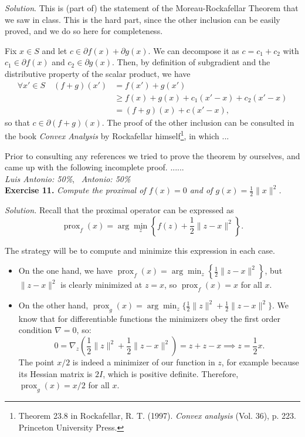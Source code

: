 \documentclass[12pt]{article}
\begin{document}
\emph{Solution}. This is (part of) the statement of the Moreau-Rockafellar Theorem that we saw in class. This is the hard part, since the other inclusion can be easily proved, and we do so here for completeness.\newpage

Fix $x\in S$ and let $c\in \partial f(x) + \partial g(x)$. We can decompose it as $c=c_1+c_2$ with $c_1\in\partial f(x)$ and $c_2\in \partial g(x)$. Then, by definition of subgradient and the distributive property of the scalar product, we have
\begin{align*}
\forall x' \in S \quad (f+g)(x') &= f(x') + g(x')\\
&\geq f(x) + g(x) + c_1(x'-x) + c_2(x'-x)\\
&= (f+g)(x) + c(x'-x),
\end{align*}
so that $c\in \partial(f+g)(x)$. The proof of the other inclusion can be consulted in the book \textit{Convex Analysis} by Rockafellar himself\footnote{Theorem 23.8 in Rockafellar, R. T. (1997). \textit{Convex analysis} (Vol. 36), p. 223. Princeton University Press.}, in which ...

Prior to consulting any references we tried to prove the theorem by ourselves, and came up with the following incomplete proof. ......\\

\textit{Luis Antonio: 50\%}, \ \textit{Antonio: 50\%}\\
\textbf{Exercise 11. }\emph{Compute the proximal of \( f(x) = 0 \) and of \( g(x) = \frac{1}{2}\|x\|^2 \).}

\emph{Solution.} Recall that the proximal operator can be expressed as
\[ \operatorname{prox}_f(x) = \arg\min_z\left\{f(z) + \frac{1}{2} \|z - x\|^2 \right\}. \]

The strategy will be to compute and minimize this expression in each case.
\begin{itemize}
    \item On the one hand, we have \( \operatorname{prox}_f(x) = \arg\min_z\left\{ \frac{1}{2} \|z - x\|^2 \right\} \), but \( \|z-x\|^2 \) is clearly minimized at \( z = x \), so $\operatorname{prox}_f(x)=x$ for all $x$.
    \item  On the other hand, \( \operatorname{prox}_g(x) = \arg\min_z\{\frac{1}{2}\|z\|^2 + \frac{1}{2} \|z - x\|^2 \}\). We know that for differentiable functions the minimizers obey the first order condition $\nabla =0$, so:
    \[
         0=\nabla_z \left(\frac{1}{2} \|z\|^2 + \frac{1}{2}\|z-x\|^2\right) = z + z - x\implies z = \frac{1}{2}x.
    \]
    The point $x/2$ is indeed a minimizer of our function in $z$, for example because its Hessian matrix is $2I$, which is positive definite. Therefore, \( \operatorname{prox}_g(x) = x/2 \) for all $x$.\\
\end{itemize}
\end{document}
